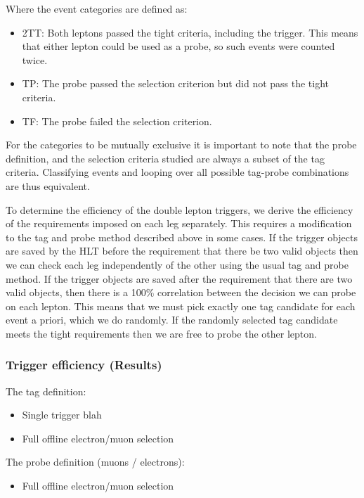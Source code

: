 Where the event categories are defined as:

\begin{itemize}
	\item 2TT: Both leptons passed the tight criteria, including the trigger. This means that either lepton could be used as a probe, 
	so such events were counted twice.
	\item TP: The probe passed the selection criterion but did not pass the tight criteria.
	\item TF: The probe failed the selection criterion.
\end{itemize}

For the categories to be mutually exclusive it is important to note that the probe definition, 
and the selection criteria studied are always a subset of the tag criteria.
Classifying events and looping over all possible tag-probe combinations are thus equivalent.

To determine the efficiency of the double lepton triggers, we derive the efficiency of the requirements imposed on each leg separately.
This requires a modification to the tag and probe method described above in some cases.
If the trigger objects are saved by the HLT before the requirement that there be two valid objects then
we can check each leg independently of the other using the usual tag and probe method.
If the trigger objects are saved after the requirement that there are two valid objects, then there is 
a 100\% correlation between the decision we can probe on each lepton.
This means that we must pick exactly one tag candidate for each event a priori, which we do 
randomly. 
If the randomly selected tag candidate meets the tight requirements then we are free to 
probe the other lepton.

\subsubsection{Trigger efficiency (Results)}

The tag definition:
\begin{itemize}
	\item  Single trigger blah
	\item Full offline electron/muon selection
\end{itemize}
	
The probe definition (muons / electrons):
\begin{itemize}
	\item  Full offline electron/muon selection
\end{itemize}


